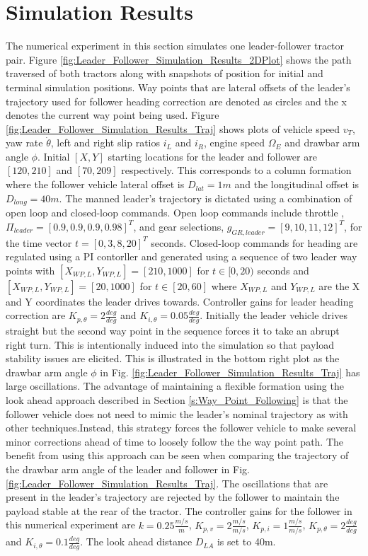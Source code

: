 \section{Simulation Results}
The numerical experiment in this section simulates one leader-follower tractor pair. Figure \ref{fig:Leader_Follower_Simulation_Results_2DPlot} shows the path traversed of both tractors along with snapshots of position for initial and terminal simulation positions. Way points that are lateral offsets of the leader's trajectory used for follower heading correction are denoted as circles and the x denotes the current way point being used. Figure \ref{fig:Leader_Follower_Simulation_Results_Traj} shows plots of vehicle speed $v_T$, yaw rate $\dot\theta$, left and right slip ratios $i_L$ and $i_R$, engine speed $\Omega_E$ and drawbar arm angle $\phi$. Initial $[X,Y]$ starting locations for the leader and follower are $[120, 210]$ and $[70, 209]$ respectively. This corresponds to a column formation where the follower vehicle lateral offset is $D_{lat}= 1m$ and the longitudinal offset is $D_{long} = 40m$. The manned leader's trajectory is dictated using a combination of open loop and closed-loop commands. Open loop commands include throttle , $\Pi_{leader} = [0.9, 0.9  ,0.9, 0.98]^T$, and gear selections, $g_{GR,leader} = [ 9 , 10 , 11 , 12]^T$, for the time vector $t = [0 , 3 , 8 , 20]^T$ seconds. Closed-loop commands for heading are regulated using a PI contorller and generated using a sequence of two leader way points with $[X_{WP,L},Y_{WP,L}] = [210,1000]$ for $ t \in [0,20)$ seconds and $[X_{WP,L},Y_{WP,L}] = [20,1000]$ for $ t \in [20,60]$ where $X_{WP,L}$ and $Y_{WP,L}$ are the X and Y coordinates the leader drives towards. Controller gains for leader heading correction are $K_{p,\theta} = 2\frac{deg}{deg}$ and $K_{i,\theta} = 0.05\frac{deg}{deg}$. Initially the leader vehicle drives straight but the second way point in the sequence forces it to take an abrupt right turn. This is intentionally induced into the simulation so that payload stability issues are elicited. This is illustrated in the bottom right plot as the drawbar arm angle $\phi$ in Fig. \ref{fig:Leader_Follower_Simulation_Results_Traj} has large oscillations. The advantage of maintaining a flexible formation using the look ahead approach described in Section \ref{s:Way_Point_Following} is that the follower vehicle does not need to mimic the leader's nominal trajectory as with other techniques.Instead, this strategy forces the follower vehicle to make several minor corrections ahead of time to loosely follow the the way point path. The benefit from using this approach can be seen when comparing the trajectory of the drawbar arm angle of the leader and follower in Fig. \ref{fig:Leader_Follower_Simulation_Results_Traj}. The oscillations that are present in the leader's trajectory are rejected by the follower to maintain the payload stable at the rear of the tractor. The controller gains for the follower in this numerical experiment are $k = 0.25\frac{m/s}{m}$, $K_{p,v} = 2 \frac{m/s}{m/s}$, $K_{p,i} = 1\frac{m/s}{m/s}$, $K_{p,\theta} = 2\frac{deg}{deg}$ and $K_{i,\theta} = 0.1\frac{deg}{deg}$. The look ahead distance $D_{LA}$ is set to 40m.

